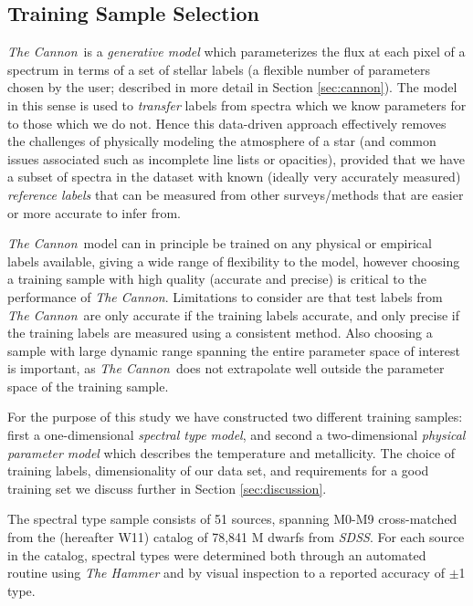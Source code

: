 \documentclass[modern]{aastex62}
\newcommand{\thecannon}{\textsl{The Cannon}}
\newcommand{\sdss}{\textsl{SDSS}}
\begin{document}
\subsection{Training Sample Selection}

\thecannon\ is a \emph{generative model} which parameterizes the flux at each pixel of a spectrum in terms of a set of stellar labels (a flexible number of parameters chosen by the user; described in more detail in Section \ref{sec:cannon}). The model in this sense is used to \emph{transfer} labels from spectra which we know parameters for to those which we do not. Hence this data-driven approach effectively removes the challenges of physically modeling the atmosphere of a star (and common issues associated such as incomplete line lists or opacities), provided that we have a subset of spectra in the dataset with known (ideally very accurately measured) \emph{reference labels} that can be measured from other surveys/methods that are easier or more accurate to infer from. 

\thecannon\ model can in principle be trained on any physical or empirical labels available, giving a wide range of flexibility to the model, however choosing a training sample with high quality (accurate and precise) is critical to the performance of \thecannon. Limitations to consider are that test labels from \thecannon\ are only accurate if the training labels accurate, and only precise if the training labels are measured using a consistent method. Also choosing a sample with large dynamic range spanning the entire parameter space of interest is important, as \thecannon\ does not extrapolate well outside the parameter space of the training sample.
\color{gcolor}{HOGG: More notes to add here?}\color{black}

For the purpose of this study we have constructed two different training samples: first a one-dimensional \emph{spectral type model}, and second a two-dimensional \emph{physical parameter model} which describes the temperature and metallicity. The choice of training labels, dimensionality of our data set, and requirements for a good training set we discuss further in Section \ref{sec:discussion}.

The spectral type sample consists of 51 sources, spanning M0-M9 cross-matched from the \citealt{West:2011} (hereafter W11) catalog of 78,841 M dwarfs from \sdss. For each source in the catalog, spectral types were determined both through an automated routine using \textsl{The Hammer} \citep{Covey:2007} and by visual inspection to a reported accuracy of $\pm$1 type.
\end{document}
